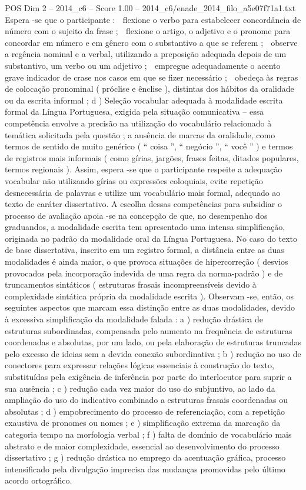 \begin{textsample}{POS Dim 2 – 2014\_c6 – Score 1.00 – 2014\_c6/enade\_2014\_filo\_a5e07f71a1.txt}
Espera -se que o participante :  flexione o verbo para estabelecer concordância de número com o sujeito da frase ;  flexione o artigo, o adjetivo e o pronome para concordar em número e em gênero com o substantivo a que se referem ;  observe a regência nominal e a verbal, utilizando a preposição adequada depois de um substantivo, um verbo ou um adjetivo ;  empregue adequadamente o acento grave indicador de crase nos casos em que se fizer necessário ;  obedeça às regras de colocação pronominal ( próclise e ênclise ), distintas dos hábitos da oralidade ou da escrita informal ; d ) Seleção vocabular adequada à modalidade escrita formal da Língua Portuguesa, exigida pela situação comunicativa – essa competência envolve a precisão na utilização do vocabulário relacionado à temática solicitada pela questão ; a ausência de marcas da oralidade, como termos de sentido de muito genérico ( “ coisa ”, “ negócio ”, “ você ” ) e termos de registros mais informais ( como gírias, jargões, frases feitas, ditados populares, termos regionais ).
Assim, espera -se que o participante respeite a adequação vocabular não utilizando gírias ou expressões coloquiais, evite repetição desnecessária de palavras e utilize um vocabulário mais formal, adequado ao texto de caráter dissertativo.
A escolha dessas competências para subsidiar o processo de avaliação apoia -se na concepção de que, no desempenho dos graduandos, a modalidade escrita tem apresentado uma intensa simplificação, originada no padrão da modalidade oral da Língua Portuguesa.
No caso do texto de base dissertativa, inscrito em um registro formal, a distância entre as duas modalidades é ainda maior, o que provoca situações de hipercorreção ( desvios provocados pela incorporação indevida de uma regra da norma-padrão ) e de truncamentos sintáticos ( estruturas frasais incompreensíveis devido à complexidade sintática própria da modalidade escrita ).
Observam -se, então, os seguintes aspectos que marcam essa distinção entre as duas modalidades, devido à excessiva simplificação da modalidade falada : a ) redução drástica de estruturas subordinadas, compensada pelo aumento na frequência de estruturas coordenadas e absolutas, por um lado, ou pela elaboração de estruturas truncadas pelo excesso de ideias sem a devida conexão subordinativa ; b ) redução no uso de conectores para expressar relações lógicas essenciais à construção do texto, substituídas pela exigência de inferência por parte do interlocutor para suprir a sua ausência ; c ) redução cada vez maior do uso do subjuntivo, ao lado da ampliação do uso do indicativo combinado a estruturas frasais coordenadas ou absolutas ; d ) empobrecimento do processo de referenciação, com a repetição exaustiva de pronomes ou nomes ; e ) simplificação extrema da marcação da categoria tempo na morfologia verbal ; f ) falta de domínio de vocabulário mais abstrato e de maior complexidade, essencial ao desenvolvimento do processo dissertativo ; g ) redução drástica no emprego da acentuação gráfica, processo intensificado pela divulgação imprecisa das mudanças promovidas pelo último acordo ortográfico.

\end{textsample}
